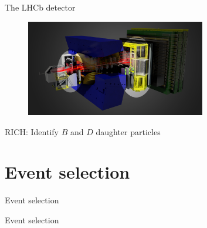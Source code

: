 \documentclass{beamer}
\begin{document}
\begin{frame}{The LHCb detector}
  \begin{figure}
    \centering
    \includegraphics[width = 0.7\textwidth]{Plots/LHCbDetector_RICH.png}
  \end{figure}
  \begin{center}
    \Large RICH: Identify $B$ and $D$ daughter particles
  \end{center}
\end{frame}

\section{Event selection}
\begin{frame}{Event selection}
  \begin{center}
    {\huge Event selection}
  \end{center}
\end{frame}
\end{document}

